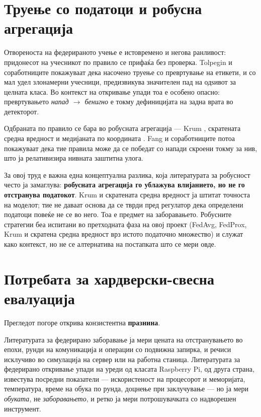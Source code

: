 \section{Труење со податоци и робусна агрегација}

Отвореноста на федерираното учење е истовремено и негова ранливост: придонесот на
учесникот по правило се прифаќа без проверка. Tolpegin и соработниците
\cite{tolpegin2020poisoning} покажуваат дека насочено труење со превртување на етикети, и
со мал удел злонамерни учесници, предизвикува значителен пад на одѕивот за целната класа.
Во контекст на откривање упади тоа е особено опасно: превртувањето \emph{напад $\to$ бенигно} е
токму дефиницијата на задна врата во детекторот.

Одбраната по правило се бара во робусната агрегација --- Krum \cite{blanchard2017krum},
скратената средна вредност и медијаната по координата \cite{yin2018trimmedmean}. Fang и
соработниците \cite{fang2020localpoisoning} потоа покажуваат дека тие правила може да се
победат со напади скроени токму за нив, што ја релативизира нивната заштитна улога.

За овој труд е важна една концептуална разлика, која литературата за робусност често ја
замаглува: \textbf{робусната агрегација го ублажува влијанието, но не го отстранува податокот}.
Krum и скратената средна вредност ја штитат точноста на моделот; тие не даваат основа да се
тврди пред регулатор дека определени податоци повеќе не се во него. Тоа е предмет на
заборавањето. Робусните стратегии беа испитани во претходната фаза на овој проект (FedAvg,
FedProx, Krum и скратена средна вредност врз истото податочно множество) и служат како
контекст, но не се алтернатива на постапката што се мери овде.

\section{Потребата за хардверски-свесна евалуација}

Прегледот погоре открива конзистентна \textbf{празнина}.

Литературата за федерирано заборавање ја мери цената на отстранувањето во епохи, рунди на
комуникација и операции со подвижна запирка, и речиси исклучиво во симулација на сервер или
на работна станица. Литературата за федерирано откривање упади на уреди од класата
Raspberry Pi, од друга страна, известува посредни показатели --- искористеност на процесорот
и меморијата, температура, време на обука по рунда, доцнење при заклучување --- но ја мери
\emph{обуката}, не \emph{заборавањето}, и ретко ја мери потрошувачката со надворешен инструмент.


